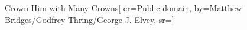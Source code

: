{Crown Him with Many Crowns}[
    cr={Public domain},
    by={Matthew Bridges/Godfrey Thring/George J. Elvey},
    sr={}]
